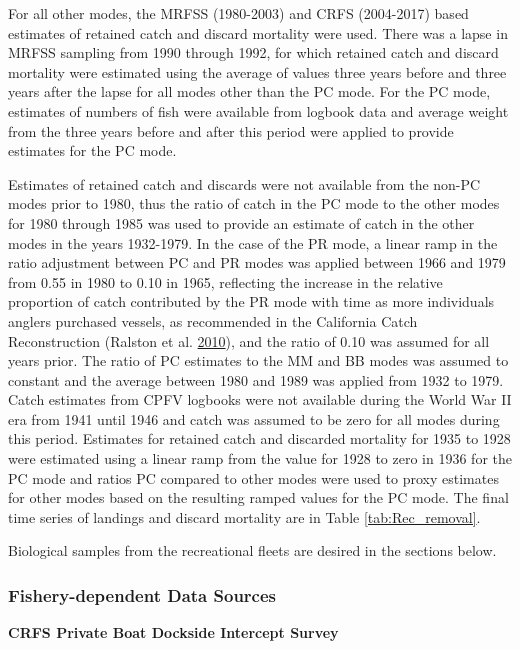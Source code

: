 \documentclass[12pt,]{article}
\begin{document}
For all other modes, the MRFSS (1980-2003) and CRFS (2004-2017) based
estimates of retained catch and discard mortality were used. There was a
lapse in MRFSS sampling from 1990 through 1992, for which retained catch
and discard mortality were estimated using the average of values three
years before and three years after the lapse for all modes other than
the PC mode. For the PC mode, estimates of numbers of fish were
available from logbook data and average weight from the three years
before and after this period were applied to provide estimates for the
PC mode.

Estimates of retained catch and discards were not available from the
non-PC modes prior to 1980, thus the ratio of catch in the PC mode to
the other modes for 1980 through 1985 was used to provide an estimate of
catch in the other modes in the years 1932-1979. In the case of the PR
mode, a linear ramp in the ratio adjustment between PC and PR modes was
applied between 1966 and 1979 from 0.55 in 1980 to 0.10 in 1965,
reflecting the increase in the relative proportion of catch contributed
by the PR mode with time as more individuals anglers purchased vessels,
as recommended in the California Catch Reconstruction (Ralston et al.
\protect\hyperlink{ref-Ralston2010}{2010}), and the ratio of 0.10 was
assumed for all years prior. The ratio of PC estimates to the MM and BB
modes was assumed to constant and the average between 1980 and 1989 was
applied from 1932 to 1979. Catch estimates from CPFV logbooks were not
available during the World War II era from 1941 until 1946 and catch was
assumed to be zero for all modes during this period. Estimates for
retained catch and discarded mortality for 1935 to 1928 were estimated
using a linear ramp from the value for 1928 to zero in 1936 for the PC
mode and ratios PC compared to other modes were used to proxy estimates
for other modes based on the resulting ramped values for the PC mode.
The final time series of landings and discard mortality are in Table
\ref{tab:Rec_removal}.

Biological samples from the recreational fleets are desired in the
sections below.

\subsubsection{Fishery-dependent Data
Sources}\label{fishery-dependent-data-sources}

\textbf{CRFS Private Boat Dockside Intercept Survey}
\end{document}
